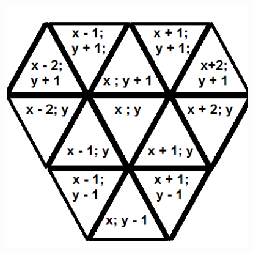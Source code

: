 \documentclass{article}
\newenvironment{Figure}
  {\par\medskip\noindent\minipage{\linewidth}}
  {\endminipage\par\medskip}
\begin{document}
\begin{multicols}{2}
\begin{Figure}
 \centering
 \includegraphics[width=0.79\textwidth]{imgs/triangle2.png}
\label{fig:triangle2std}
\end{Figure}


\end{multicols}
\end{document}
